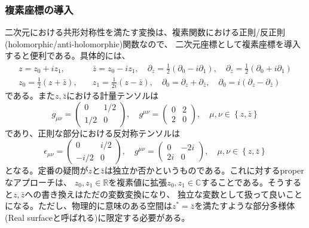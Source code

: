 \documentclass[11pt, aps, longbibliography]{article}
\numberwithin{equation}{section}
\begin{document}
    \subsubsection{複素座標の導入}
        二次元における共形対称性を満たす変換は、複素関数における正則/反正則(holomorphic/anti-holomorphic)関数なので、
        二次元座標として複素座標を導入すると便利である。具体的には、
        \begin{align}
            z = z_0 + iz_1, &\quad  \bar{z} = z_0 - iz_1, \quad \partial_z = \frac{1}{2}(\partial_0 - i\partial_1), \quad \partial_{\bar{z}} = \frac{1}{2}(\partial_0 + i\partial_1) \\
            z_0 = \frac{1}{2}(z + \bar{z}), &\quad z_1 = \frac{1}{2i}(z-\bar{z}), \quad \partial_0 = \partial_z + \partial_{\bar{z}}, \quad \partial_0 = i(\partial_z - \partial_{\bar{z}}) 
        \end{align}
        である。また$z, \bar{z}$における計量テンソルは
        \begin{equation}
            g_{\mu\nu} = \begin{pmatrix} 0 & 1/2 \\ 1/2 & 0\end{pmatrix}, \quad g^{\mu\nu} = \begin{pmatrix} 0 & 2 \\ 2 & 0\end{pmatrix}, \quad \mu,\nu \in \left\{z, \bar{z}\right\}
        \end{equation}
        であり、正則な部分における反対称テンソルは
        \begin{equation}
            \epsilon_{\mu\nu} = \begin{pmatrix} 0 & i/2 \\ -i/2 & 0\end{pmatrix}, \quad g^{\mu\nu} = \begin{pmatrix} 0 & -2i \\ 2i & 0\end{pmatrix}, \quad \mu,\nu \in \left\{z, \bar{z}\right\}
        \end{equation}
        となる。定番の疑問が$z$と$\bar{z}$は独立か否かというものである。これに対するproperなアプローチは、
        $z_0,z_1\in \mathbb{R}$を複素値に拡張$z_0,z_1\in \mathbb{C}$することである。そうすると$z,\bar{z}$への書き換えはただの変数変換になり、
        独立な変数として扱って良いことになる。ただし、物理的に意味のある空間は$z^*=\bar{z}$を満たすような部分多様体(Real surfaceと呼ばれる)に限定する必要がある。
\end{document}

